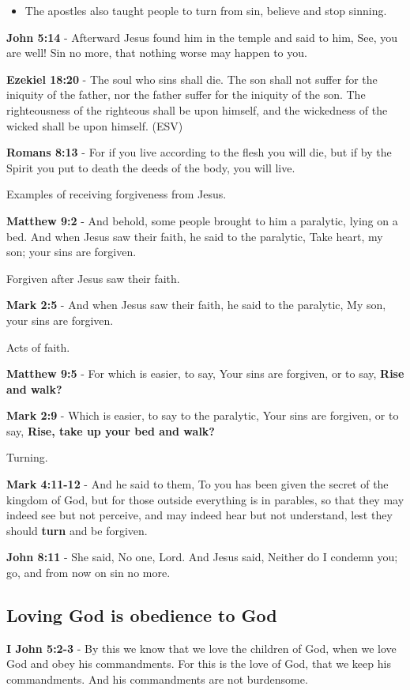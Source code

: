 \documentclass[11pt]{article}
\begin{document}
\begin{itemize}
\item The apostles also taught people to turn from sin, believe and stop sinning.
\end{itemize}

\textbf{John 5:14} - Afterward Jesus found him in the temple and said to him, See, you are well! Sin no more, that nothing worse may happen to you.

\textbf{Ezekiel 18:20} - The soul who sins shall die. The son shall not suffer for the iniquity of the father, nor the father suffer for the iniquity of the son. The righteousness of the righteous shall be upon himself, and the wickedness of the wicked shall be upon himself. (ESV)

\textbf{Romans 8:13} - For if you live according to the flesh you will die, but if by the Spirit you put to death the deeds of the body, you will live.

Examples of receiving forgiveness from Jesus.

\textbf{Matthew 9:2} - And behold, some people brought to him a paralytic, lying on a bed. And when Jesus saw their faith, he said to the paralytic, Take heart, my son; your sins are forgiven.

Forgiven after Jesus saw their faith.

\textbf{Mark 2:5} - And when Jesus saw their faith, he said to the paralytic, My son, your sins are forgiven.

Acts of faith.

\textbf{Matthew 9:5} - For which is easier, to say, Your sins are forgiven, or to say, \textbf{Rise and walk?}

\textbf{Mark 2:9} - Which is easier, to say to the paralytic, Your sins are forgiven, or to say, \textbf{Rise, take up your bed and walk?}

Turning.

\textbf{Mark 4:11-12} - And he said to them, To you has been given the secret of the kingdom of God, but for those outside everything is in parables, so that they may indeed see but not perceive, and may indeed hear but not understand, lest they should \textbf{turn} and be forgiven.

\textbf{John 8:11} - She said, No one, Lord. And Jesus said, Neither do I condemn you; go, and from now on sin no more.

\subsection{Loving God is obedience to God}
\label{sec:org4c93c8a}
\textbf{I John 5:2-3} - By this we know that we love the children of God, when we love God and obey his commandments. For this is the love of God, that we keep his commandments. And his commandments are not burdensome.
\end{document}
